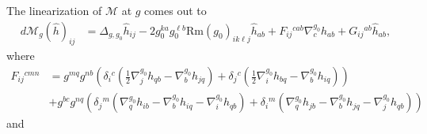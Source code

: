 \documentclass[12pt]{amsart}
\newcommand{\calM}{\mathcal{M}}
\renewcommand{\1}{{\mathbf 1}}
\newcommand{\Rm}{\mathrm{Rm}}
\theoremstyle{others}
\numberwithin{equation}{section}
\begin{document}
\noindent The linearization of $\calM$ at $g$ comes out to
\begin{equation}\label{dMcompactexpression}
\begin{split}
d\calM_{g}(\hat{h})_{ij} & = \Delta_{g,g_0} \hat{h}_{ij} -2 g_0^{ka}g_0^{\ell b} \Rm(g_0)_{ik\ell j} \hat{h}_{ab} + F_{ij}{}^{cab} \nabla^{g_0}_c \hat{h}_{ab} + G_{ij}{}^{ab} \hat{h}_{ab},
\end{split}
\end{equation}
where
\begin{equation}\label{Fexpression}
\begin{split}
F_{ij}{}^{cmn} %
    & = g^{mq} g^{nb} \left( \delta_i{}^c  \left( \frac12 \nabla^{g_0}_j h_{qb} - \nabla^{g_0}_b h_{jq} \right) + \delta_j{}^c \left( \frac12 \nabla^{g_0}_i h_{bq} - \nabla^{g_0}_b h_{iq} \right) \right) \\
   & + g^{bc} g^{nq} \left( \delta_j{}^m \left( \nabla^{g_0}_q h_{ib} - \nabla^{g_0}_b h_{iq} - \nabla^{g_0}_i h_{qb} \right) + \delta_i{}^m \left( \nabla^{g_0}_q h_{jb} - \nabla^{g_0}_b h_{jq} - \nabla^{g_0}_j h_{qb} \right) \right) 
\end{split}
\end{equation}
and
\end{document}
